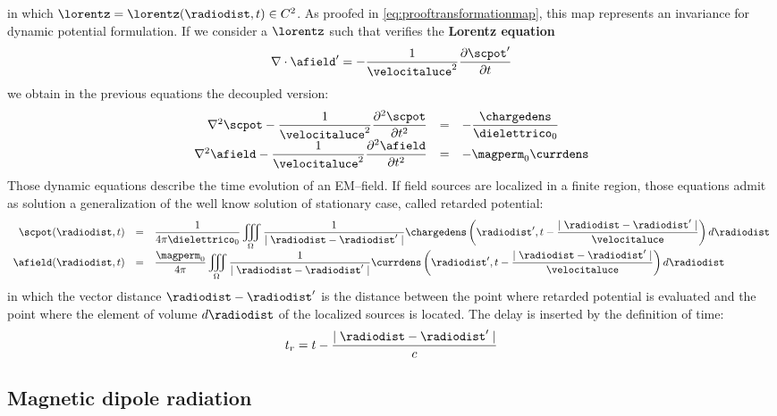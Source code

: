 in which $\lorentz = \lorentz(\radiodist,t) \in C^2$. As proofed in \ref{eq:prooftransformationmap}, this map represents an invariance for dynamic potential formulation. If we consider a $\lorentz$ such that verifies the \textbf{Lorentz equation}
\begin{equation}
\nabla \cdot \afield' = - \dfrac{1}{\velocitaluce^2} \partialtarg{\scpot'}
\end{equation}
we obtain in the previous equations the decoupled version:
\begin{equation}
\begin{array}{rcl}
\nabla^2 \scpot - \dfrac{1}{\velocitaluce^2} \partialttarg{\scpot} & = & - \dfrac{\chargedens}{\dielettrico_0} \\
\nabla^2 \afield - \dfrac{1}{\velocitaluce^2} \partialttarg{\afield} & = & - \magperm_0 \currdens 
\end{array}
\end{equation}
Those dynamic equations describe the time evolution of an EM--field. If field sources are localized in a finite region, those equations admit as solution a generalization of the well know solution of stationary case, called retarded potential:
\begin{equation}
\begin{array}{rcl}
\scpot(\radiodist,t) & = & \dfrac{1}{4\pi \dielettrico_0} \displaystyle\iiint\limits_{\Omega} \dfrac{1}{\mid \radiodist - \radiodist' \mid} \chargedens\left( \radiodist',t-\dfrac{\mid \radiodist - \radiodist' \mid}{\velocitaluce} \right) d\radiodist   \\
\afield(\radiodist,t) & = & \dfrac{\magperm_0}{4\pi} \displaystyle\iiint\limits_{\Omega} \dfrac{1}{\mid \radiodist - \radiodist' \mid} \currdens\left( \radiodist',t-\dfrac{\mid \radiodist - \radiodist' \mid}{\velocitaluce} \right) d\radiodist 
\end{array}
\end{equation}
in which the vector distance $\radiodist - \radiodist'$ is the distance between the point where retarded potential is evaluated and the point where the element of volume $d\radiodist$ of the localized sources is located. The delay is inserted by the definition of time:
\[
t_r = t - \dfrac{\mid \radiodist - \radiodist' \mid}{c}
\]

\subsection{Magnetic dipole radiation}

